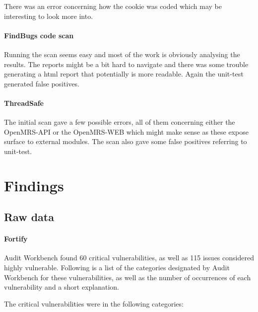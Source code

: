 \documentclass{report} %
\begin{document}
  There was an error concerning how the cookie was coded which may be
  interesting to look more into.

\paragraph{FindBugs code scan}

  Running the scan seems easy and most of the work is obviously analysing the
  results. The reports might be a bit hard to navigate and there was some
  trouble generating a html report that potentially is more readable. Again the
  unit-test generated false positives.

\paragraph{ThreadSafe} %

The initial scan gave a few possible errors, all of them concerning either the
OpenMRS-API or the OpenMRS-WEB which might make sense as these expose surface to
external modules. The scan also gave some false positives referring to
unit-test.
  
  \newpage

\section{Findings}

\subsection{Raw data}

\paragraph{Fortify}

  Audit Workbench found 60 critical vulnerabilities, as well as 115 issues
  considered highly vulnerable. Following is a list of the categories designated
  by Audit Workbench for these vulnerabilities, as well as the number of
  occurrences of each vulnerability and a short explanation.

  The critical vulnerabilities were in the
  following categories:
  
\end{document}
